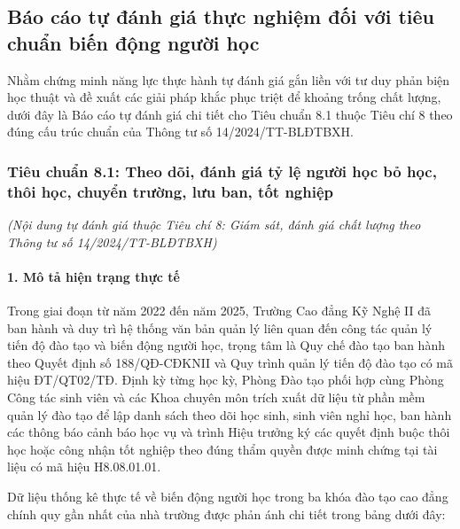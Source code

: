 \subsection{Báo cáo tự đánh giá thực nghiệm đối với tiêu chuẩn biến động người học}

Nhằm chứng minh năng lực thực hành tự đánh giá gắn liền với tư duy phản biện học thuật và đề xuất các giải pháp khắc phục triệt để khoảng trống chất lượng, dưới đây là Báo cáo tự đánh giá chi tiết cho Tiêu chuẩn 8.1 thuộc Tiêu chí 8 theo đúng cấu trúc chuẩn của Thông tư số 14/2024/TT-BLĐTBXH.

\subsubsection{Tiêu chuẩn 8.1: Theo dõi, đánh giá tỷ lệ người học bỏ học, thôi học, chuyển trường, lưu ban, tốt nghiệp}

\noindent\textit{(Nội dung tự đánh giá thuộc Tiêu chí 8: Giám sát, đánh giá chất lượng theo Thông tư số 14/2024/TT-BLĐTBXH)}\par\vspace{0.2cm}

\paragraph{1. Mô tả hiện trạng thực tế}
Trong giai đoạn từ năm 2022 đến năm 2025, Trường Cao đẳng Kỹ Nghệ II đã ban hành và duy trì hệ thống văn bản quản lý liên quan đến công tác quản lý tiến độ đào tạo và biến động người học, trọng tâm là Quy chế đào tạo ban hành theo Quyết định số 188/QĐ-CĐKNII và Quy trình quản lý tiến độ đào tạo có mã hiệu ĐT/QT02/TĐ. Định kỳ từng học kỳ, Phòng Đào tạo phối hợp cùng Phòng Công tác sinh viên và các Khoa chuyên môn trích xuất dữ liệu từ phần mềm quản lý đào tạo để lập danh sách theo dõi học sinh, sinh viên nghỉ học, ban hành các thông báo cảnh báo học vụ và trình Hiệu trưởng ký các quyết định buộc thôi học hoặc công nhận tốt nghiệp theo đúng thẩm quyền được minh chứng tại tài liệu có mã hiệu H8.08.01.01.

Dữ liệu thống kê thực tế về biến động người học trong ba khóa đào tạo cao đẳng chính quy gần nhất của nhà trường được phản ánh chi tiết trong bảng dưới đây:


